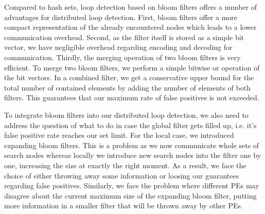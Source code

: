 Compared to hash sets, loop detection based on bloom filters offers a number of advantages for distributed loop detection. First, bloom filters offer a more compact representation of the already encountered nodes which leads to a lower communication overhead. Second, as the filter itself is stored as a simple bit vector, we have negligible overhead regarding encoding and decoding for communication. Thirdly, the merging operation of two bloom filters is very efficient. To merge two bloom filters, we perform a simple bitwise or operation of the bit vectors. In a combined filter, we get a conservative upper bound for the total number of contained elements by adding the number of elements of both filters. This guarantees that our maximum rate of false positives is not exceeded. \\
\begin{comment}
- bloom filters have additional advantages:
- smaller size makes them efficient to communicate
- also, encoding and decoding for communication is trivial as the filter consists of a simple bit vector
- bloom filters can be merged efficiently via bitwise operations
- bloom filters are shared between all workers by regularly performing a distributed reduction operation with a subsequent broadcast afterwards
- this takes logarithmic number of steps in the number of workers
- this gives us some global loop detection capabilities back
- we approximate the number of search nodes contained in the global filter as the sum of nodes in our communicated filters, this gives us a conservative upper bound which guarantees that our bounds for false positives are not violated
\end{comment}
To integrate bloom filters into our distributed loop detection, we also need to address the question of what to do in case the global filter gets filled up, i.e. it's false positive rate reaches our set limit. For the local case, we introduced expanding bloom filters.
This is a problem as we now communicate whole sets of search nodes whereas locally we introduce new search nodes into the filter one by one, increasing the size at exactly the right moment. As a result, we face the choice of either throwing away some information or loosing our guarantees regarding false positives. Similarly, we face the problem where different PEs may disagree about the current maximum size of the expanding bloom filter, putting more information in a smaller filter that will be thrown away by other PEs. \\
